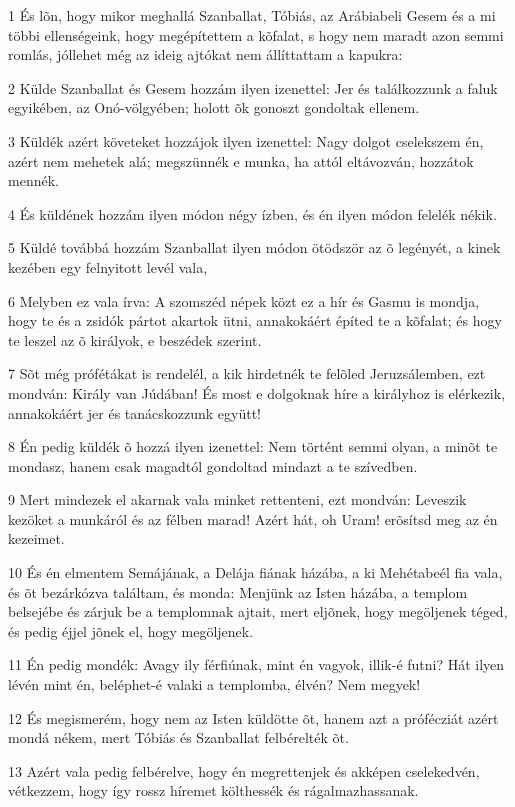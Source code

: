\par 1 És lõn, hogy mikor meghallá Szanballat, Tóbiás, az Arábiabeli Gesem és a mi többi ellenségeink, hogy megépítettem a kõfalat, s hogy nem maradt azon semmi romlás, jóllehet még az ideig ajtókat nem állíttattam a kapukra:
\par 2 Külde Szanballat és Gesem hozzám ilyen izenettel: Jer és találkozzunk a faluk egyikében, az Onó-völgyében; holott õk gonoszt gondoltak ellenem.
\par 3 Küldék azért követeket hozzájok ilyen izenettel: Nagy dolgot cselekszem én, azért nem mehetek alá; megszünnék e munka, ha attól eltávozván, hozzátok mennék.
\par 4 És küldének hozzám ilyen módon négy ízben, és én ilyen módon felelék nékik.
\par 5 Küldé továbbá hozzám Szanballat ilyen módon ötödször az õ legényét, a kinek kezében egy felnyitott levél vala,
\par 6 Melyben ez vala írva: A szomszéd népek közt ez a hír és Gasmu is mondja, hogy te és a zsidók pártot akartok ütni, annakokáért építed te a kõfalat; és hogy te leszel az õ királyok, e beszédek szerint.
\par 7 Sõt még prófétákat is rendelél, a kik hirdetnék te felõled Jeruzsálemben, ezt mondván: Király van Júdában! És most e dolgoknak híre a királyhoz is elérkezik, annakokáért jer és tanácskozzunk együtt!
\par 8 Én pedig küldék õ hozzá ilyen izenettel: Nem történt semmi olyan, a minõt te mondasz, hanem csak magadtól gondoltad mindazt a te szívedben.
\par 9 Mert mindezek el akarnak vala minket rettenteni, ezt mondván: Leveszik kezöket a munkáról és az félben marad! Azért hát, oh Uram! erõsítsd meg az én kezeimet.
\par 10 És én elmentem Semájának, a Delája fiának házába, a ki Mehétabeél fia vala, és õt bezárkózva találtam, és monda: Menjünk az Isten házába, a templom belsejébe és zárjuk be a templomnak ajtait, mert eljõnek, hogy megöljenek téged, és pedig éjjel jõnek el, hogy megöljenek.
\par 11 Én pedig mondék: Avagy ily férfiúnak, mint én vagyok, illik-é futni? Hát ilyen lévén mint én, beléphet-é valaki a templomba, élvén? Nem megyek!
\par 12 És megismerém, hogy nem az Isten küldötte õt, hanem azt a prófécziát azért mondá nékem, mert Tóbiás és Szanballat felbérelték õt.
\par 13 Azért vala pedig felbérelve, hogy én megrettenjek és akképen cselekedvén, vétkezzem, hogy így rossz híremet költhessék és rágalmazhassanak.
